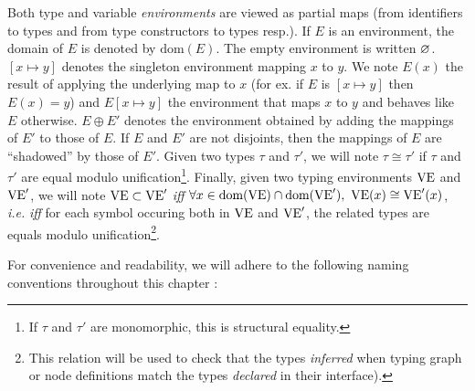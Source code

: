 Both type and variable \emph{environments} are viewed as partial maps (from identifiers to types and
from type constructors to types resp.). If $E$ is an environment, the domain of $E$ is denoted by
$\text{dom}(E)$.  The empty environment is written $\varnothing$.  $[x \mapsto y]$ denotes the
singleton environment mapping $x$ to $y$.  We note $E(x)$ the result of applying the underlying map
to $x$ (for ex. if $E$ is $[x \mapsto y]$ then $E(x)=y$) and $E[x \mapsto y]$ the environment that
maps $x$ to $y$ and behaves like $E$ otherwise. $E \oplus E'$ denotes the environment obtained by
adding the mappings of $E'$ to those of $E$. If $E$ and $E'$ are not disjoints, then the mappings of
$E$ are ``shadowed'' by those of $E'$. Given two types $\tau$ and $\tau'$, we will note
$\tau \cong \tau'$ if $\tau$ and $\tau'$ are equal modulo unification\footnote{If $\tau$ and $\tau'$
  are monomorphic, this is structural equality.}. Finally, given two typing environments $\text{VE}$ and
$\text{VE}'$, we will note $\text{VE} \subset \text{VE}'$ \emph{iff}
$\forall x \in \text{dom}(\text{VE}) \cap \text{dom}(\text{VE}'),\ \text{VE}(x) \cong \text{VE}'(x)$, \emph{i.e.} \emph{iff}
for each symbol occuring both in $\text{VE}$ and $\text{VE}'$, the related types are equals modulo
unification\footnote{This relation will be used to check that the types \emph{inferred} when typing graph or node
definitions match the types \emph{declared} in their interface).}. 



\medskip
For convenience and readability, we will adhere to the following
naming conventions throughout this chapter :

